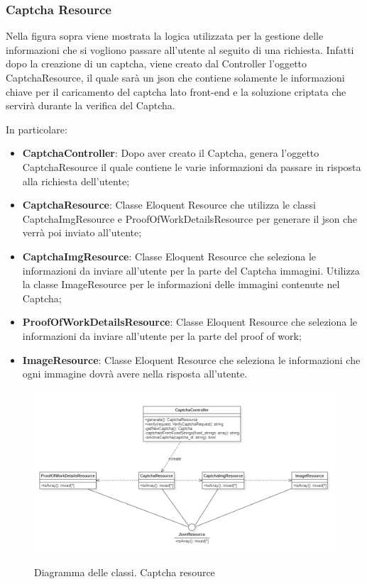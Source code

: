 \subsubsection{Captcha Resource}
Nella figura sopra viene mostrata la logica utilizzata per la gestione delle informazioni che si vogliono passare all'utente al seguito di una richiesta. Infatti dopo la creazione di un captcha, viene creato dal Controller l'oggetto CaptchaResource, il quale sarà un json che contiene solamente le informazioni chiave per il caricamento del captcha lato front-end e la soluzione criptata che servirà durante la verifica del Captcha.

In particolare:
\begin{itemize}
	\item \textbf{CaptchaController}: Dopo aver creato il Captcha, genera l'oggetto CaptchaResource il quale contiene le varie informazioni da passare in risposta alla richiesta dell'utente;
	\item \textbf{CaptchaResource}: Classe Eloquent Resource che utilizza le classi CaptchaImgResource e ProofOfWorkDetailsResource per generare il json che verrà poi inviato all'utente;
	\item \textbf{CaptchaImgResource}: Classe Eloquent Resource che seleziona le informazioni da inviare all'utente per la parte del Captcha immagini. Utilizza la classe ImageResource per le informazioni delle immagini contenute nel Captcha;
	\item \textbf{ProofOfWorkDetailsResource}: Classe Eloquent Resource che seleziona le informazioni da inviare all'utente per la parte del proof of work;
	\item \textbf{ImageResource}: Classe Eloquent Resource che seleziona le informazioni che ogni immagine dovrà avere nella risposta all'utente.
	
	
\end{itemize}

\begin{figure}[H]
	\centering
	\includegraphics[scale = 0.6]{img/captcha_resource.png}\\
	\caption{Diagramma delle classi. Captcha resource}
\end{figure}
\newpage

